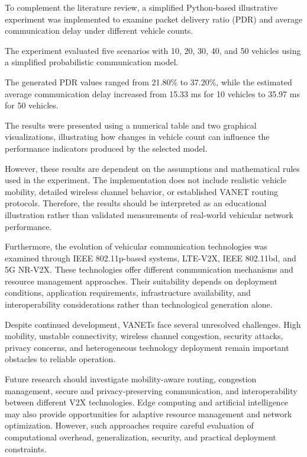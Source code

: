 To complement the literature review,
a simplified Python-based illustrative
experiment was implemented to examine
packet delivery ratio (PDR) and average
communication delay under different
vehicle counts.

The experiment evaluated five scenarios
with 10, 20, 30, 40, and 50 vehicles
using a simplified probabilistic
communication model.

The generated PDR values ranged from
21.80\% to 37.20\%, while the estimated
average communication delay increased
from 15.33 ms for 10 vehicles to
35.97 ms for 50 vehicles.

The results were presented using a
numerical table and two graphical
visualizations, illustrating how
changes in vehicle count can influence
the performance indicators produced
by the selected model.

However, these results are dependent
on the assumptions and mathematical
rules used in the experiment.
The implementation does not include
realistic vehicle mobility, detailed
wireless channel behavior, or
established VANET routing protocols.
Therefore, the results should be
interpreted as an educational
illustration rather than validated
measurements of real-world
vehicular network performance.

Furthermore, the evolution of vehicular
communication technologies was examined
through IEEE 802.11p-based systems,
LTE-V2X, IEEE 802.11bd, and 5G NR-V2X.
These technologies offer different
communication mechanisms and resource
management approaches. Their suitability
depends on deployment conditions,
application requirements, infrastructure
availability, and interoperability
considerations rather than technological
generation alone.

Despite continued development, VANETs
face several unresolved challenges.
High mobility, unstable connectivity,
wireless channel congestion, security
attacks, privacy concerns, and
heterogeneous technology deployment
remain important obstacles to
reliable operation.

Future research should investigate
mobility-aware routing, congestion
management, secure and privacy-preserving
communication, and interoperability
between different V2X technologies.
Edge computing and artificial
intelligence may also provide
opportunities for adaptive resource
management and network optimization.
However, such approaches require
careful evaluation of computational
overhead, generalization, security,
and practical deployment constraints.

